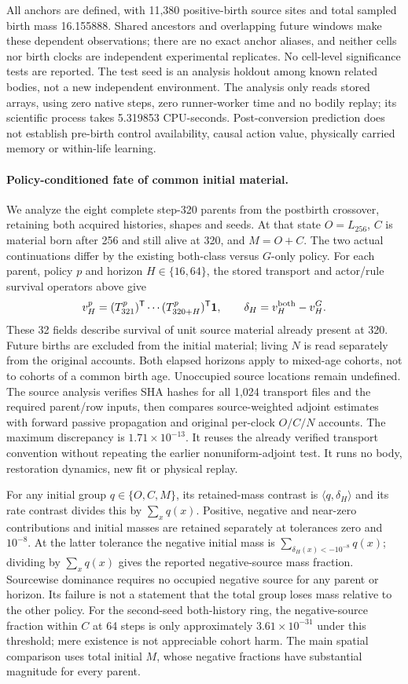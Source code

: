 All anchors are defined, with 11,380 positive-birth source sites and total sampled birth mass 16.155888. Shared ancestors and overlapping future windows make these dependent observations; there are no exact anchor aliases, and neither cells nor birth clocks are independent experimental replicates. No cell-level significance tests are reported. The test seed is an analysis holdout among known related bodies, not a new independent environment. The analysis only reads stored arrays, using zero native steps, zero runner-worker time and no bodily replay; its scientific process takes 5.319853 CPU-seconds. Post-conversion prediction does not establish pre-birth control availability, causal action value, physically carried memory or within-life learning.

\paragraph{Policy-conditioned fate of common initial material.}We analyze the eight complete step-320 parents from the postbirth crossover, retaining both acquired histories, shapes and seeds. At that state $O=L_{256}$, $C$ is material born after 256 and still alive at 320, and $M=O+C$. The two actual continuations differ by the existing both-class versus $G$-only policy. For each parent, policy $p$ and horizon $H\in\{16,64\}$, the stored transport and actor/rule survival operators above give
\[
v^p_H=(T^p_{321})^{\mathsf T}\cdots(T^p_{320+H})^{\mathsf T}\mathbf{1},
\qquad \delta_H=v^{\rm both}_H-v^G_H.
\]
These 32 fields describe survival of unit source material already present at 320. Future births are excluded from the initial material; living $N$ is read separately from the original accounts. Both elapsed horizons apply to mixed-age cohorts, not to cohorts of a common birth age. Unoccupied source locations remain undefined. The source analysis verifies SHA hashes for all 1,024 transport files and the required parent/row inputs, then compares source-weighted adjoint estimates with forward passive propagation and original per-clock $O/C/N$ accounts. The maximum discrepancy is $1.71\times10^{-13}$. It reuses the already verified transport convention without repeating the earlier nonuniform-adjoint test. It runs no body, restoration dynamics, new fit or physical replay.

For any initial group $q\in\{O,C,M\}$, its retained-mass contrast is $\langle q,\delta_H\rangle$ and its rate contrast divides this by $\sum_xq(x)$. Positive, negative and near-zero contributions and initial masses are retained separately at tolerances zero and $10^{-8}$. At the latter tolerance the negative initial mass is $\sum_{\delta_H(x)<-10^{-8}}q(x)$; dividing by $\sum_xq(x)$ gives the reported negative-source mass fraction. Sourcewise dominance requires no occupied negative source for any parent or horizon. Its failure is not a statement that the total group loses mass relative to the other policy. For the second-seed both-history ring, the negative-source fraction within $C$ at 64 steps is only approximately $3.61\times10^{-31}$ under this threshold; mere existence is not appreciable cohort harm. The main spatial comparison uses total initial $M$, whose negative fractions have substantial magnitude for every parent.

